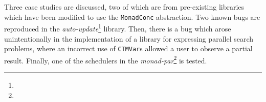 Three case studies are discussed, two of which are from pre-existing
libraries which have been modified to use the \verb|MonadConc|
abstraction. Two known bugs are reproduced in the
\emph{auto-update}\footnote{} library. Then,
there is a bug which arose unintentionally in the implementation of a
library for expressing parallel search problems, where an incorrect
use of \verb|CTMVar|s allowed a user to observe a partial
result. Finally, one of the schedulers in the
\emph{monad-par}\footnote{} is tested.
